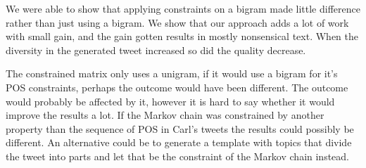 \documentclass[a4paper,12pt]{article}
\begin{document}
We were able to show that applying constraints on a bigram made little difference rather than just using a bigram. We show that our approach adds a lot of work with small gain, and the gain gotten results in mostly nonsensical text. When the diversity in the generated tweet increased so did the quality decrease.

The constrained matrix only uses a unigram, if it would use a bigram for it's POS constraints, perhaps the outcome would have been different. The outcome would probably be affected by it, however it is hard to say whether it would improve the results a lot. If the Markov chain was constrained by another property than the sequence of POS in Carl's tweets the results could possibly be different. An alternative could be to generate a template with topics that divide the tweet into parts and let that be the constraint of the Markov chain instead.




\end{document}
